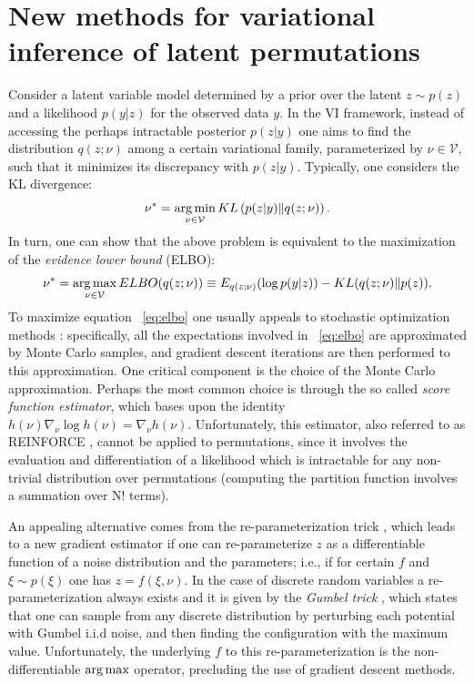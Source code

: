 \documentclass{article}
\begin{document}
 \section{New methods for variational inference of latent permutations}
  \label{sec:VI}
 Consider a latent variable model  determined by a prior over the latent $z\sim p(z)$ and a likelihood $p(y|z)$ for the observed data $y$. In the VI framework, instead of accessing the perhaps intractable posterior $p(z|y)$ one aims to find the distribution $q(z;\nu)$ among a certain variational family, parameterized by $\nu\in \mathcal{V}$, such that it minimizes its discrepancy with $p(z|y)$. Typically, one considers the KL divergence:
 \begin{equation} \nu^* = \argmin_{\nu\in\mathcal{V}} KL\left(p(z|y)\lVert q(z;\nu)\right).\end{equation}
In turn, one can show that the above problem is equivalent to the maximization of the \emph{evidence lower bound} (ELBO):
 \begin{equation}\label{eq:elbo} \nu^* = \argmax_{\nu\in\mathcal{V}} ELBO(q(z;\nu))\equiv  E_{q(z;\nu)}(\log p(y|z)) - KL(q(z;\nu)\lVert p(z)).\end{equation}
 To maximize equation ~\eqref{eq:elbo} one usually appeals to stochastic optimization methods \citep{Kushner1987}: specifically, all the expectations involved in ~\eqref{eq:elbo} are approximated by Monte Carlo samples, and gradient descent iterations are then performed to this approximation. One critical component is the choice of the Monte Carlo approximation. Perhaps the most common choice is through the so called \emph{score function estimator}, which bases upon the identity $h(\nu) \nabla_\nu \log h(\nu) =\nabla_\nu h(\nu)$. Unfortunately, this estimator, also referred to as REINFORCE \citep{Williams1992}, cannot be applied to permutations, since it involves the evaluation and differentiation of a likelihood which is intractable for any non-trivial distribution over permutations (computing the partition function involves a summation over N! terms).
 
An appealing alternative comes from the re-parameterization trick \cite{Kingma2013}, which leads to a new gradient estimator if one can re-parameterize $z$ as a differentiable function of a noise distribution and the parameters; i.e., if for certain $f$ and $\xi\sim p(\xi)$ one has $z=f(\xi,\nu)$. In the case of discrete random variables a re-parameterization always exists and it is given by the \emph{Gumbel trick} \citep{Papandreou2011,Balog2017}, which states that one can sample from any discrete distribution by perturbing each potential with Gumbel i.i.d noise, and then finding the configuration with the maximum value. Unfortunately, the underlying $f$ to this re-parameterization is the non-differentiable $\argmax$ operator, precluding the use of gradient descent methods.
\end{document}
